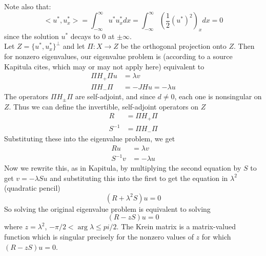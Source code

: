 \documentclass[12pt]{article}
\begin{document}
Note also that:
\[
<u^*, u^*_x> = \int_{-\infty}^{\infty}u^* u^*_x dx = \int_{-\infty}^{\infty} \left(\frac{1}{2} (u^*)^2\right)_x dx = 0 
\]
since the solution $u^*$ decays to 0 at $\pm \infty$.\\

Let $Z = \{u^*, u^*_x\}^\perp$ and let $\Pi: X \rightarrow Z$ be the orthogonal projection onto $Z$. Then for nonzero eigenvalues, our eigenvalue problem is (according to a source Kapitula cites, which may or may not apply here) equivalent to 
\begin{align}
\Pi H_+ \Pi u &= \lambda v \\
\Pi H_- \Pi &= -JHu = -\lambda u
\end{align}
The operators $\Pi H_\pm \Pi$ are self-adjoint, and since $d \neq 0$, each one is nonsingular on $Z$. Thus we can define the invertible, self-adjoint operators on $Z$
\begin{align}
R &= \Pi H_+ \Pi  \\
S^{-1} &= \Pi H_- \Pi
\end{align}
Substituting these into the eigenvalue problem, we get
\begin{align}
R u &= \lambda v \\
S^{-1} v &= -\lambda u
\end{align}
Now we rewrite this, as in Kapitula, by multiplying the second equation by $S$ to get $v = -\lambda S u$ and substituting this into the first to get the equation in $\lambda^2$ (quadratic pencil)
\[
(R + \lambda^2 S)u = 0
\]
So solving the original eigenvalue problem is equivalent to solving
\[
(R - zS)u = 0
\]
where $z = \lambda^2$, $-\pi/2 < \arg \lambda \leq pi/2$. The Krein matrix is a matrix-valued function which is singular precisely for the nonzero values of $z$ for which $(R - zS)u = 0$.\\
\end{document}
